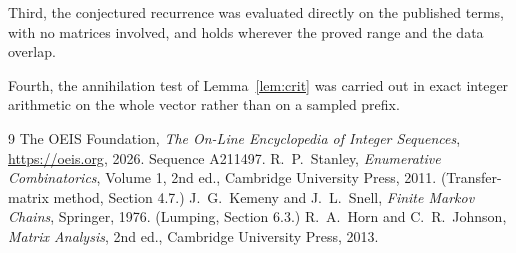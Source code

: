 \documentclass[11pt,a4paper]{article}
\theoremstyle{plain}
\theoremstyle{definition}
\begin{document}
Third, the conjectured recurrence was evaluated directly on the published terms, with no
matrices involved, and holds wherever the proved range and the data overlap.

Fourth, the annihilation test of Lemma~\ref{lem:crit} was carried out in exact integer
arithmetic on the whole vector rather than on a sampled prefix.

\begin{thebibliography}{9}
 The OEIS Foundation, \emph{The On-Line Encyclopedia of Integer
Sequences}, \url{https://oeis.org}, 2026. Sequence A211497.
 R.~P.~Stanley, \emph{Enumerative Combinatorics}, Volume 1, 2nd ed.,
Cambridge University Press, 2011. (Transfer-matrix method, Section 4.7.)
 J.~G.~Kemeny and J.~L.~Snell, \emph{Finite Markov Chains}, Springer, 1976.
(Lumping, Section 6.3.)
 R.~A.~Horn and C.~R.~Johnson, \emph{Matrix Analysis}, 2nd ed., Cambridge
University Press, 2013.
\end{thebibliography}
\end{document}
